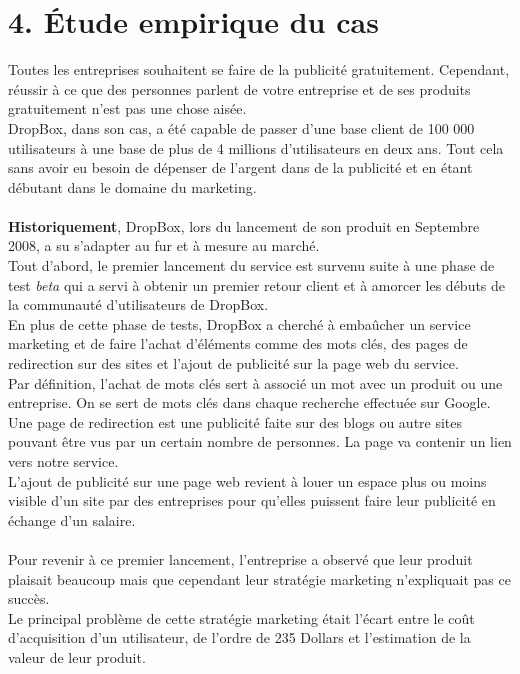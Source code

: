 \documentclass[a4paper, 10pt]{article}
\begin{document}
\section*{4. Étude empirique du cas}
Toutes les entreprises souhaitent se faire de la publicité gratuitement.
Cependant, réussir à ce que des personnes parlent de votre entreprise et de ses produits gratuitement n'est pas une chose aisée.\\
DropBox, dans son cas, a été capable de passer d'une base client de 100 000 utilisateurs
à une base de plus de 4 millions d'utilisateurs en deux ans.
Tout cela sans avoir eu besoin de dépenser de l'argent dans de la publicité et en étant débutant dans le domaine du marketing.\\ \\
\textbf{Historiquement}, DropBox, lors du lancement de son produit en Septembre 2008, a su s'adapter au fur et à mesure au marché.\\
Tout d'abord, le premier lancement du service est survenu suite à une phase de test \textit{beta} qui a servi
à obtenir un premier retour client et à amorcer les débuts de la communauté d'utilisateurs de DropBox.\\
En plus de cette phase de tests, DropBox a cherché à embaûcher un service marketing et de faire l'achat d'éléments comme
des mots clés, des pages de redirection sur des sites et l'ajout de publicité sur la page web du service.\\
Par définition, l'achat de mots clés sert à associé un mot avec un produit ou une entreprise.
On se sert de mots clés dans chaque recherche effectuée sur Google.\\
Une page de redirection est une publicité faite sur des blogs ou autre sites pouvant être vus par un certain nombre de personnes.
La page va contenir un lien vers notre service.\\
L'ajout de publicité sur une page web revient à louer un espace plus ou moins visible d'un site par des entreprises pour qu'elles
puissent faire leur publicité en échange d'un salaire.\\ \\
Pour revenir à ce premier lancement, l'entreprise a observé que leur produit plaisait beaucoup mais que cependant leur stratégie
marketing n'expliquait pas ce succès.\\
Le principal problème de cette stratégie marketing était l'écart entre le coût d'acquisition d'un utilisateur, de l'ordre de 235 Dollars
et l'estimation de la valeur de leur produit.\\
\end{document}

